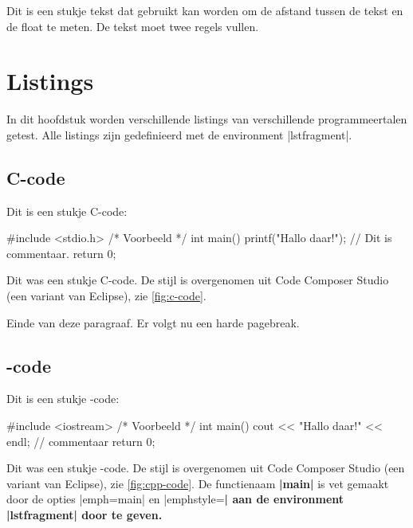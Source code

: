\begin{llstShortInline}


Dit is een stukje tekst dat gebruikt kan worden om de afstand tussen de tekst en de float te meten. De tekst moet twee regels vullen.

\chapter{Listings}
In dit hoofdstuk worden verschillende listings van verschillende programmeertalen getest. Alle listings zijn gedefinieerd met de environment |lstfragment|.

\clearpage
\section{C-code}
Dit is een stukje C-code:
\begin{lstfragment}[style=cstyle]
#include <stdio.h>
/* Voorbeeld */
int main()
{
	printf("Hallo daar!\n"); // Dit is commentaar.
	return 0;
}
\end{lstfragment}
Dit was een stukje C-code. 
De stijl is overgenomen uit Code Composer Studio (een variant van Eclipse), zie \cref{fig:c-code}.


Einde van deze paragraaf. 
Er volgt nu een harde pagebreak.

\clearpage
\section{\texorpdfstring{\protect\Cpp-code}{C++-code}}
Dit is een stukje \Cpp{}-code:
\begin{lstfragment}[style=cppstyle,emph=main, emphstyle=\bfseries]
#include <iostream>
/* Voorbeeld */
int main() {
	cout << "Hallo daar!" << endl; // commentaar
	return 0;
}
\end{lstfragment}
Dit was een stukje \Cpp{}-code. 
De stijl is overgenomen uit Code Composer Studio (een variant van Eclipse), zie \cref{fig:cpp-code}.
De functienaam {\bfseries|main|} is vet gemaakt door de opties |emph=main| en |emphstyle=\bfseries| aan de environment |lstfragment| door te geven.


\end{llstShortInline}

